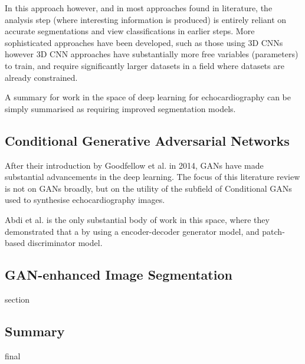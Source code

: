 In this approach however, and in most approaches found in literature, the
analysis step (where interesting information is produced) is entirely reliant on
accurate segmentations and view classifications in earlier steps. More
sophisticated approaches have been developed, such as those using 3D CNNs
\cite{ouyangEchoNetDynamicLargeNew} however 3D CNN approaches have substantially
more free variables (parameters) to train, and require significantly larger
datasets in a field where datasets are already constrained. \newline

A summary for work in the space of deep learning for echocardiography can be
simply summarised as requiring improved segmentation models. \newline

\subsection{Conditional Generative Adversarial Networks}

After their introduction by Goodfellow et al. in 2014, GANs have made
substantial advancements in the deep learning. The focus of this literature
review is not on GANs broadly, but on the utility of the subfield of Conditional
GANs used to synthesise echocardiography images. \newline

Abdi et al. is the only substantial body of work in this space, where they
demonstrated that a by using a encoder-decoder generator model, and patch-based
discriminator model.

\subsection{GAN-enhanced Image Segmentation}

section

\subsection{Summary}

final